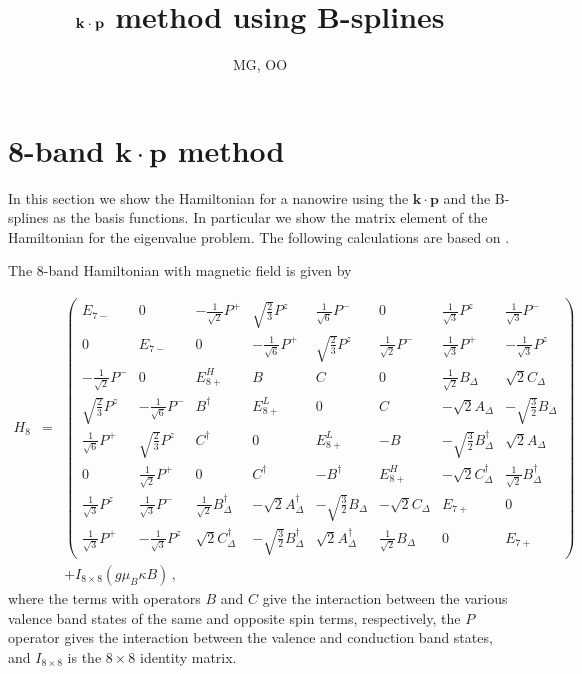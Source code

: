 \documentclass[12pt,a4paper]{article}
\title{$\ve{k}\cdot \ve{p}$ method using B-splines}
\author{MG, OO}
\newcommand{\ve}[1]{\mathbf{#1}}
\begin{document}
\maketitle

\section{8-band $\ve{k}\cdot \ve{p}$ method}
In this section we show the Hamiltonian for a nanowire using the $\ve{k\cdot p}$ and the B-splines
as the basis functions. In particular we show the matrix element of the Hamiltonian for the
eigenvalue problem. The following calculations are based on \cite{kishore2014electronic}.

The 8-band Hamiltonian with magnetic field is given by

\begin{eqnarray}
H_8 &=& \begin{pmatrix}
      E_{7-} & 0 & -\frac{1}{\sqrt{2}}P^+ & \sqrt{\frac{2}{3}}P^z & \frac{1}{\sqrt{6}}P^- & 0 & \frac{1}{\sqrt{3}}P^z & \frac{1}{\sqrt{3}}P^- \\

      0      & E_{7-} & 0 & -\frac{1}{\sqrt{6}}P^+ & \sqrt{\frac{2}{3}}P^z & \frac{1}{\sqrt{2}}P^- & \frac{1}{\sqrt{3}}P^+ & -\frac{1}{\sqrt{3}}P^z \\

      -\frac{1}{\sqrt{2}}P^- & 0 & E_{8+}^H & B & C & 0 & \frac{1}{\sqrt{2}}B_{\Delta} & \sqrt{2}C_{\Delta} \\

      \sqrt{\frac{2}{3}}P^z & -\frac{1}{\sqrt{6}}P^- & B^{\dag} & E_{8+}^L & 0 & C & -\sqrt{2}A_{\Delta} & -\sqrt{\frac{3}{2}}B_{\Delta} \\

      \frac{1}{\sqrt{6}}P^+ & \sqrt{\frac{2}{3}}P^z & C^{\dag} & 0 & E_{8+}^L & -B & -\sqrt{\frac{3}{2}}B_{\Delta}^{\dag} & \sqrt{2}A_{\Delta} \\

      0      & \frac{1}{\sqrt{2}}P^+ & 0 & C^{\dag} & -B^{\dag} & E_{8+}^H & -\sqrt{2}C_{\Delta}^{\dag} & \frac{1}{\sqrt{2}}B_{\Delta}^{\dag} \\

      \frac{1}{\sqrt{3}}P^z & \frac{1}{\sqrt{3}}P^- & \frac{1}{\sqrt{2}}B_{\Delta}^{\dag} & -\sqrt{2}A_{\Delta}^{\dag} & -\sqrt{\frac{3}{2}}B_{\Delta} & -\sqrt{2}C_{\Delta} & E_{7+} & 0 \\

      \frac{1}{\sqrt{3}}P^+ & -\frac{1}{\sqrt{3}}P^z & \sqrt{2}C_{\Delta}^{\dag} & -\sqrt{\frac{3}{2}}B_{\Delta}^{\dag} & \sqrt{2}A_{\Delta}^{\dag} & \frac{1}{\sqrt{2}}B_{\Delta} & 0 & E_{7+}
      \end{pmatrix} \\
      & & + I_{8\times8}\left( g \mu_B \kappa B\right) \,,
\end{eqnarray}
\noindent
where the terms with operators $B$ and $C$ give the interaction between the various valence band states of
the same and opposite spin terms, respectively, the $P$ operator gives the interaction between the valence
and conduction band states, and $I_{8\times8}$ is the $8\times8$ identity matrix.
\end{document}
